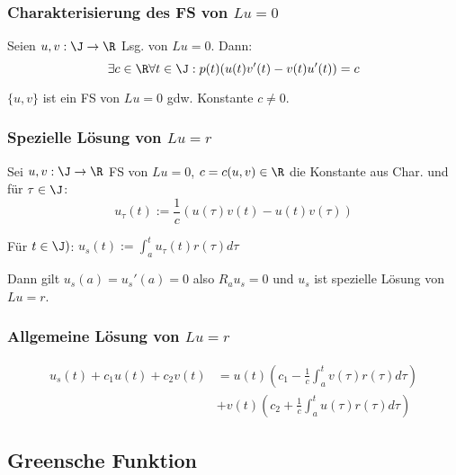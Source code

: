 \subsubsection*{Charakterisierung des FS von \(Lu=0\)}

Seien \(u,v : \J \to \R\) Lsg. von \(Lu=0\). Dann: \[\exists c \in \R \forall t \in \J : p(t)(u(t)v'(t)-v(t)u'(t)) = c\]

\(\{u,v\}\) ist ein FS von \(Lu=0\) gdw. Konstante \(c \neq 0\).

\subsubsection*{Spezielle Lösung von \(Lu=r\)}

Sei \(u,v : \J \to \R\) FS von \(Lu=0\), \(c = c(u,v) \in \R\) die Konstante aus Char. und für \(\tau \in \J\): \[u_\tau(t) := \frac{1}{c} (u(\tau)v(t)-u(t)v(\tau))\]

Für \(t \in \J)\): \(u_s(t) := \displaystyle\int_a^t u_\tau(t) r(\tau) d\tau\)

Dann gilt \(u_s(a) = u_s'(a) = 0\) also \(R_a u_s = 0\) und \(u_s\) ist spezielle Lösung von \(Lu=r\).

\subsubsection*{Allgemeine Lösung von \(Lu=r\)}

\vspace*{-4mm}
\begin{align*}
u_s(t)+c_1 u(t) + c_2 v(t) &= u(t)\left(c_1-\frac{1}{c}\int_a^t v(\tau) r(\tau) d\tau \right) \\
&+ v(t)\left(c_2+\frac{1}{c}\int_a^t u(\tau)r(\tau) d\tau \right)
\end{align*}

\subsection*{Greensche Funktion}
